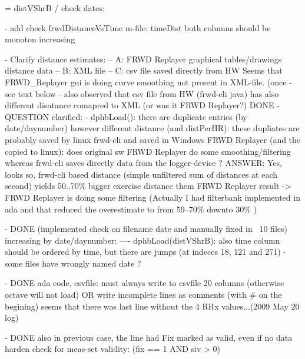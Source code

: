 
= distVShrB / check dates: 

- add check frwdDistanceVsTime m-file: timeDist both columns should be monoton increasing

- Clarify distance estimates:
-- A: FRWD Replayer graphical tables/drawings distance data
-- B: XML file
-- C: csv file saved directly from HW
Seems that FRWD_Replayer gui is doing curve smoothing not present in 
XML-file. 
(once - see text below - also observed that csv file from HW (frwd-cli java)
has also different disatance comapred to XML (or was it FRWD Replayer?)
DONE - QUESTION clarified: 
- dphbLoad(): there are duplicate entries (by date/daynumber) however
different distance (and distPerHR): 
these dupliates are probably saved by linux frwd-cli and
saved in Windows FRWD Replayer (and the copied to linux):
does original sw FRWD Replayer do some smoothing/filtering whereas 
frwd-cli saves directly data from the logger-device ?
ANSWER: Yes, looks so, frwd-cli based distance (simple unfiltered 
sum of distances at each second) yields 50..70\% bigger exercise distance
them FRWD Replayer result -> FRWD Replayer is doing some filtering 
(Actually I had filterbank implemented in ada and that reduced the
overestimate to from 59--70\% downto 30\% )

- DONE (implemented check on filename date and manually fixed in ~10 files) 
     increasing by date/daynumber:
     ---- dphbLoad(distVShrB): also time column should be ordered by time,
     but there are jumps (at indeces 18, 121 and 271) - 
     some files have wrongly named date ?

- DONE ada code, csvfile: must always write to csvfile 20 columns 
(otherwise octave will not load)
OR write incomplete lines as comments (with # on the begining)
seems that there was last line without the 4 RRx values...(2009 May 20 log)

- DONE also in previous case, the line had Fix marked as valid, even if no data
harden check for meas-set validity: (fix == 1 AND siv > 0)


